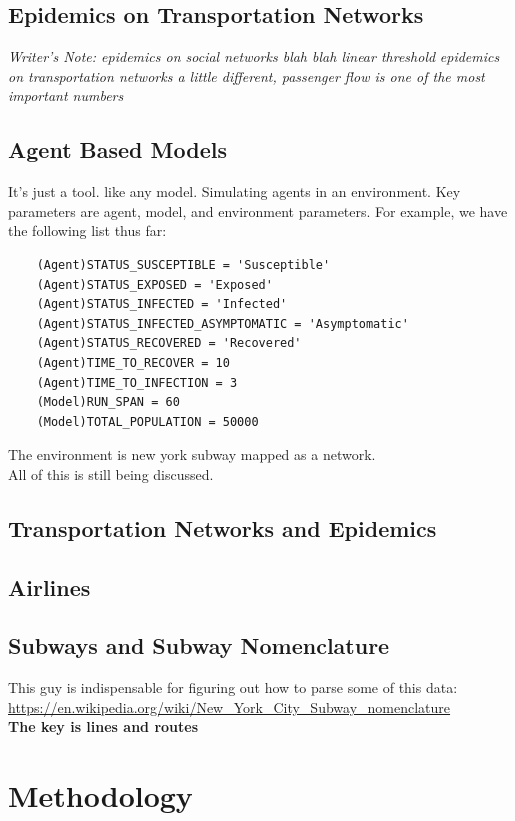 \documentclass[12pt, a4, epsf] {article}
\theoremstyle{plain}
\theoremstyle{definition}
\begin{document}
\subsection*{Epidemics on Transportation Networks}
\textit{Writer's Note: epidemics on social networks blah blah linear threshold}
\textit{epidemics on transportation networks a little different, passenger flow is one of the most important numbers}
\subsection*{Agent Based Models}
It's just a tool. like any model. Simulating agents in an environment. Key parameters are agent, model, and environment parameters. For example, we have the following list thus far:\\
\begin{verbatim}
	(Agent)STATUS_SUSCEPTIBLE = 'Susceptible'
	(Agent)STATUS_EXPOSED = 'Exposed'
	(Agent)STATUS_INFECTED = 'Infected'
	(Agent)STATUS_INFECTED_ASYMPTOMATIC = 'Asymptomatic'
	(Agent)STATUS_RECOVERED = 'Recovered'
	(Agent)TIME_TO_RECOVER = 10
	(Agent)TIME_TO_INFECTION = 3
	(Model)RUN_SPAN = 60
	(Model)TOTAL_POPULATION = 50000
\end{verbatim}
The environment is new york subway mapped as a network.\\ 
All of this is still being discussed.\\
\subsection*{Transportation Networks and Epidemics}
\subsection*{Airlines}
\subsection*{Subways and Subway Nomenclature}
This guy is indispensable for figuring out how to parse some of this data:\\
\url{https://en.wikipedia.org/wiki/New_York_City_Subway_nomenclature}\\
\textbf{The key is lines and routes}\\
\section*{Methodology}
\end{document}
